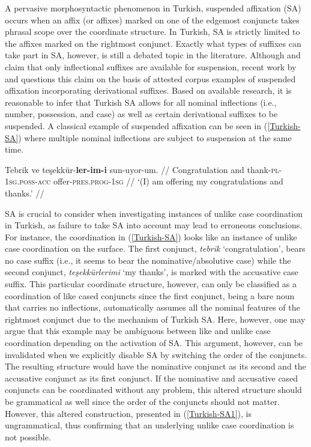 A pervasive morphosyntactic phenomenon in Turkish, suspended affixation (SA) occurs when an affix (or affixes) marked on one of the edgemost conjuncts takes phrasal scope over the coordinate structure. In Turkish, SA is strictly limited to the affixes marked on the rightmost conjunct. Exactly what types of suffixes can take part in SA, however, is still a debated topic in the literature. Although \citet{Kabak+2007} and \citet{kornfilt+2012} claim that only inflectional suffixes are available for suspension, recent work by \citet{akkus2016} and \citet{sensekerci_22} questions this claim on the basis of attested corpus examples of suspended affixation incorporating derivational suffixes. Based on available research, it is reasonable to infer that Turkish SA allows for all nominal inflections (i.e., number, possession, and case) as well as certain derivational suffixes to be suspended. A classical example of suspended affixation can be seen in (\ref{Turkish-SA}) where multiple nominal inflections are subject to suspension at the same time.

\pex[glspace=!1em,everygla={},everyglb={},aboveglbskip=-.15ex, interpartskip=15pt]
\label{Turkish-SA} \begingl
\gla Tebrik ve teşekkür-\textbf{ler-im-i} sun-uyor-um. //
\glb Congratulation and thank-\textsc{pl}-\textsc{1sg.poss}-\textsc{acc} offer-\textsc{pres.prog}-\textsc{1sg} //
\glft `(I) am offering my congratulations and thanks.' //
\endgl
\xe

SA is crucial to consider when investigating instances of unlike case coordination in Turkish, as failure to take SA into account may lead to erroneous conclusions. For instance, the coordination in (\ref{Turkish-SA}) looks like an instance of unlike case coordination on the surface. The first conjunct, \textit{tebrik} `congratulation', bears no case suffix (i.e., it seems to bear the nominative/absolutive case) while the second conjunct, \textit{teşekkürlerimi} `my thanks', is marked with the accusative case suffix. This particular coordinate structure, however, can only be classified as a coordination of like cased conjuncts since the first conjunct, being a bare noun that carries no inflections, automatically assumes all the nominal features of the rightmost conjunct due to the mechanism of Turkish SA. Here, however, one may argue that this example may be ambiguous between like and unlike case coordination depending on the activation of SA. This argument, however, can be invalidated when we explicitly disable SA by switching the order of the conjuncts. The resulting structure would have the nominative conjunct as its second and the accusative conjunct as its first conjunct. If the nominative and accusative cased conjuncts can be coordinated without any problem, this altered structure should be grammatical as well since the order of the conjuncts should not matter. However, this altered construction, presented in (\ref{Turkish-SA1}), is ungrammatical, thus confirming that an underlying unlike case coordination is not possible.

